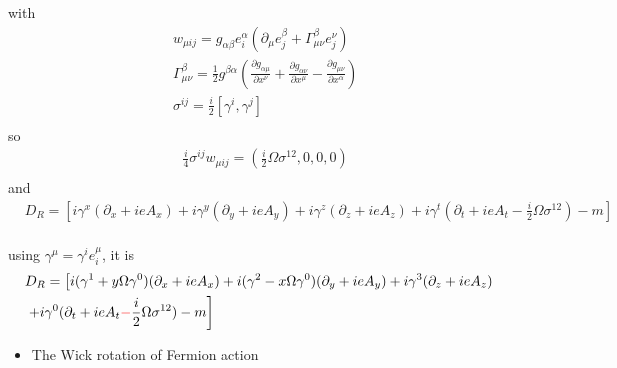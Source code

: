 with
\begin{equation}
\begin{split}
&w_{\mu ij}=g_{\alpha \beta}e_i^{\alpha}(\partial _{\mu}e_j^{\beta}+\Gamma ^{\beta}_{\mu\nu}e_j^{\nu})\\
&\Gamma ^{\beta}_{\mu\nu}=\frac{1}{2}g^{\beta \alpha}\left(\frac{\partial g _{\alpha \mu}}{\partial x ^{\nu}}+\frac{\partial g _{\alpha \nu}}{\partial x ^{\mu}}-\frac{\partial g_{\mu\nu}}{\partial x^{\alpha}}\right)\\
&\sigma ^{ij}=\frac{i}{2}[\gamma ^i,\gamma ^j]\\
\end{split}
\end{equation}
so
\begin{equation}
\begin{split}
&\frac{i}{4}\sigma ^{ij}w_{\mu ij}=\left(\frac{i}{2}\Omega \sigma ^{12},0,0,0\right)\\
\end{split}
\end{equation}
and
\begin{equation}
\begin{split}
&D_R=\left[i\gamma ^x (\partial _x+ieA_x)+i\gamma ^y (\partial _y+ieA_y)+i\gamma ^z (\partial _z+ieA_z)+i\gamma ^t (\partial _t+ieA_t-\frac{i}{2}\Omega \sigma ^{12})-m\right]\\
\end{split}
\end{equation}

using $\gamma ^{\mu}=\gamma ^i e_i^{\mu}$, it is
\begin{equation}
\begin{split}
&D_R=\left[i(\gamma ^1+y\Omega \gamma^0) (\partial _x+ieA_x)+i(\gamma ^2-x\Omega \gamma^0) (\partial _y+ieA_y)+i\gamma ^3 (\partial _z+ieA_z)\right.\\
&\left.+i\gamma ^0 (\partial _t+ieA_t\textcolor[rgb]{1,0,0}{-}\frac{i}{2}\Omega \sigma ^{12})-m\right]\\
\end{split}
\end{equation}

\begin{itemize}
  \item The Wick rotation of Fermion action
\end{itemize}

